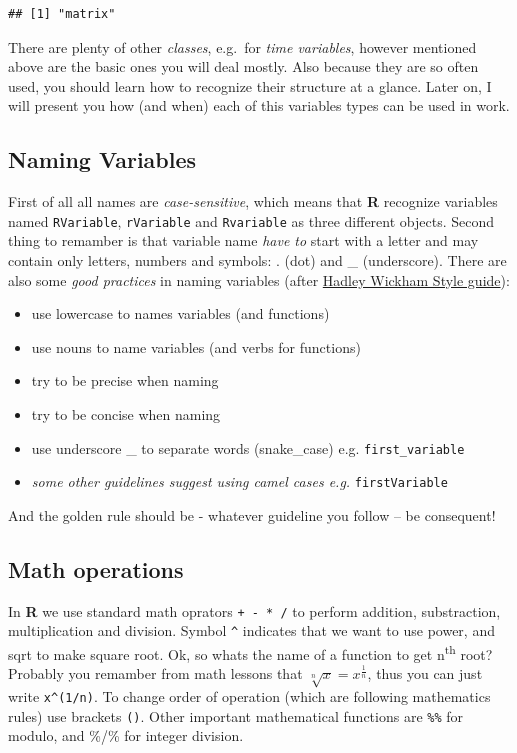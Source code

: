 \documentclass[]{book}
\providecommand{\tightlist}{%
  \setlength{\itemsep}{0pt}\setlength{\parskip}{0pt}}
\theoremstyle{definition}
\theoremstyle{definition}
\theoremstyle{definition}
\theoremstyle{remark}
\begin{document}
\begin{verbatim}
## [1] "matrix"
\end{verbatim}

There are plenty of other \emph{classes}, e.g.~for \emph{time
variables}, however mentioned above are the basic ones you will deal
mostly. Also because they are so often used, you should learn how to
recognize their structure at a glance. Later on, I will present you how
(and when) each of this variables types can be used in work.

\subsection{Naming Variables}\label{naming-variables}

First of all all names are \emph{case-sensitive}, which means that
\textbf{R} recognize variables named \texttt{RVariable},
\texttt{rVariable} and \texttt{Rvariable} as three different objects.
Second thing to remamber is that variable name \emph{have to} start with
a letter and may contain only letters, numbers and symbols: . (dot) and
\_ (underscore). There are also some \emph{good practices} in naming
variables (after \href{http://adv-r.had.com.nz/Style.html}{Hadley
Wickham Style guide}):

\begin{itemize}
\tightlist
\item
  use lowercase to names variables (and functions)
\item
  use nouns to name variables (and verbs for functions)
\item
  try to be precise when naming
\item
  try to be concise when naming
\item
  use underscore \_ to separate words (snake\_case) e.g.
  \texttt{first\_variable}
\item
  \emph{some other guidelines suggest using camel cases e.g.}
  \texttt{firstVariable}
\end{itemize}

And the golden rule should be - whatever guideline you follow -- be
consequent!

\subsection{Math operations}\label{math-operations}

In \textbf{R} we use standard math oprators \texttt{+\ -\ *\ /} to
perform addition, substraction, multiplication and division. Symbol
\texttt{\^{}} indicates that we want to use power, and sqrt to make
square root. Ok, so whats the name of a function to get
n\textsuperscript{th} root? Probably you remamber from math lessons that
\(\sqrt [n] {x} = x^\frac{1}{n}\), thus you can just write
\texttt{x\^{}(1/n)}. To change order of operation (which are following
mathematics rules) use brackets \texttt{()}. Other important
mathematical functions are \texttt{\%\%} for modulo, and \%/\% for
integer division.
\end{document}
